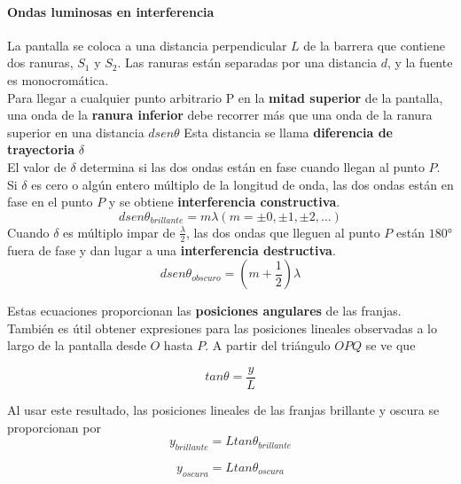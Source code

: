 \documentclass[10pt]{article}
\begin{document}
\paragraph{Ondas luminosas en interferencia}

La pantalla se coloca a una distancia perpendicular $L$ de la barrera que contiene dos ranuras, $S_1$ y $S_2$.
Las ranuras están separadas por una distancia $d$, y la fuente es monocromática.\\
\linebreak
Para llegar a cualquier punto arbitrario P en la \textbf{mitad superior} de la pantalla, una onda de la \textbf{ranura
inferior} debe recorrer más que una onda de la ranura superior en una distancia $d sen \theta$  Esta distancia se llama \textbf{diferencia de trayectoria} $\delta$\\
\linebreak
El valor de $\delta$ determina si las dos ondas están en fase cuando llegan al punto $P$. Si $\delta$ es cero
o algún entero múltiplo de la longitud de onda, las dos ondas están en fase en el punto $P$
y se obtiene \textbf{interferencia constructiva}.
\begin{equation*}
	dsen\theta_{brillante} = m\lambda (m = \pm 0, \pm 1, \pm 2, \dots)
\end{equation*}
Cuando $\delta$ es múltiplo impar de $\frac{\lambda}{2}$, las dos ondas que lleguen al punto $P$ están $180°$
fuera de fase y dan lugar a una \textbf{interferencia destructiva}.
\begin{equation*}
	dsen\theta_{obscuro} = \left(m+\frac{1}{2}\right)\lambda 
\end{equation*}

Estas ecuaciones proporcionan las \textbf{posiciones angulares} de las franjas.\\
\linebreak
También es útil obtener expresiones para las posiciones lineales observadas a lo largo de la pantalla desde
$O$ hasta $P$. A partir del triángulo $OPQ$ se ve que

\begin{equation*}
	tan\theta = \dfrac{y}{L}
\end{equation*}

Al usar este resultado, las posiciones lineales de las franjas brillante y oscura se proporcionan por
\begin{equation*}
	y_{brillante} = Ltan\theta_{brillante}
\end{equation*}

\begin{equation*}
	y_{oscura} = Ltan\theta_{oscura}
\end{equation*}
\end{document}
